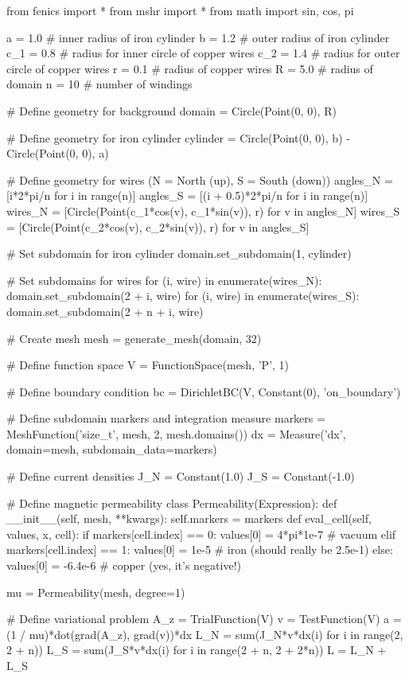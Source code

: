 \begin{python}
from fenics import *
from mshr import *
from math import sin, cos, pi

a = 1.0   # inner radius of iron cylinder
b = 1.2   # outer radius of iron cylinder
c_1 = 0.8 # radius for inner circle of copper wires
c_2 = 1.4 # radius for outer circle of copper wires
r = 0.1   # radius of copper wires
R = 5.0   # radius of domain
n = 10    # number of windings

# Define geometry for background
domain = Circle(Point(0, 0), R)

# Define geometry for iron cylinder
cylinder = Circle(Point(0, 0), b) - Circle(Point(0, 0), a)

# Define geometry for wires (N = North (up), S = South (down))
angles_N = [i*2*pi/n for i in range(n)]
angles_S = [(i + 0.5)*2*pi/n for i in range(n)]
wires_N = [Circle(Point(c_1*cos(v), c_1*sin(v)), r) for v in angles_N]
wires_S = [Circle(Point(c_2*cos(v), c_2*sin(v)), r) for v in angles_S]

# Set subdomain for iron cylinder
domain.set_subdomain(1, cylinder)

# Set subdomains for wires
for (i, wire) in enumerate(wires_N):
    domain.set_subdomain(2 + i, wire)
for (i, wire) in enumerate(wires_S):
    domain.set_subdomain(2 + n + i, wire)

# Create mesh
mesh = generate_mesh(domain, 32)

# Define function space
V = FunctionSpace(mesh, 'P', 1)

# Define boundary condition
bc = DirichletBC(V, Constant(0), 'on_boundary')

# Define subdomain markers and integration measure
markers = MeshFunction('size_t', mesh, 2, mesh.domains())
dx = Measure('dx', domain=mesh, subdomain_data=markers)

# Define current densities
J_N = Constant(1.0)
J_S = Constant(-1.0)

# Define magnetic permeability
class Permeability(Expression):
    def __init__(self, mesh, **kwargs):
        self.markers = markers
    def eval_cell(self, values, x, cell):
        if markers[cell.index] == 0:
            values[0] = 4*pi*1e-7 # vacuum
        elif markers[cell.index] == 1:
            values[0] = 1e-5      # iron (should really be 2.5e-1)
        else:
            values[0] = -6.4e-6   # copper (yes, it's negative!)

mu = Permeability(mesh, degree=1)

# Define variational problem
A_z = TrialFunction(V)
v = TestFunction(V)
a = (1 / mu)*dot(grad(A_z), grad(v))*dx
L_N = sum(J_N*v*dx(i) for i in range(2, 2 + n))
L_S = sum(J_S*v*dx(i) for i in range(2 + n, 2 + 2*n))
L = L_N + L_S


\end{python}
